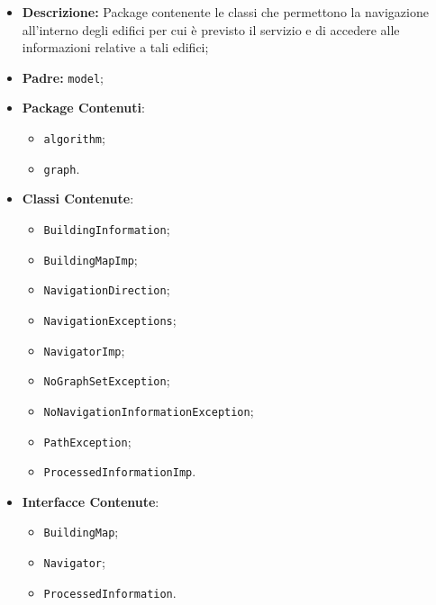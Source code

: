 \documentclass[../DefinizioneDiProdotto.tex]{subfiles}
\begin{document}
\begin{itemize}
	\item \textbf{Descrizione:} Package contenente le classi che permettono la navigazione all'interno degli edifici per cui è previsto il servizio e di accedere alle informazioni relative a tali edifici;
	\item \textbf{Padre:} \texttt{model};
	\item \textbf{Package Contenuti}:
	\begin{itemize}
		\item \texttt{algorithm};
		
		\item \texttt{graph}.
		
	\end{itemize}
	\item \textbf{Classi Contenute}:
	\begin{itemize}
		\item \texttt{BuildingInformation};
		
		\item \texttt{BuildingMapImp};
		
		\item \texttt{NavigationDirection};
		
		\item \texttt{NavigationExceptions};
		
		\item \texttt{NavigatorImp};
		
		\item \texttt{NoGraphSetException};
		
		\item \texttt{NoNavigationInformationException};
		
		\item \texttt{PathException};
		
		\item \texttt{ProcessedInformationImp}.
		
	\end{itemize}
	\item \textbf{Interfacce Contenute}:
	\begin{itemize}
		\item \texttt{BuildingMap};
		
		\item \texttt{Navigator};
		
		\item \texttt{ProcessedInformation}.
		
	\end{itemize}
\end{itemize}
\end{document}
